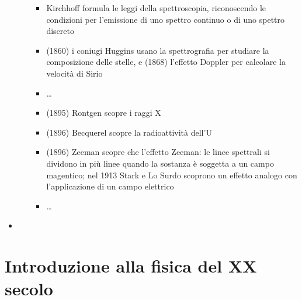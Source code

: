 \documentclass[letterpaper,10pt,italian]{jupyterBook}
\begin{document}
\begin{itemize}
\begin{itemize}
\begin{itemize}
\item {} 
\sphinxAtStartPar
Kirchhoff formula le leggi della spettroscopia, riconoscendo le condizioni per l’emissione di uno spettro continuo o di uno spettro discreto

\item {} 
\sphinxAtStartPar
(1860) i coniugi Huggins usano la spettrografia per studiare la composizione delle stelle, e (1868) l’effetto Doppler per calcolare la velocità di Sirio  

\item {} 
\sphinxAtStartPar
…

\item {} 
\sphinxAtStartPar
(1895) Rontgen scopre i raggi X

\item {} 
\sphinxAtStartPar
(1896) Becquerel scopre la radioattività dell’U

\item {} 
\sphinxAtStartPar
(1896) Zeeman scopre che l’effetto Zeeman: le linee spettrali si dividono in più linee quando la sostanza è soggetta a un campo magentico; nel 1913 Stark e Lo Surdo scoprono un effetto analogo con l’applicazione di un campo elettrico

\item {} 
\sphinxAtStartPar
…

\end{itemize}

\end{itemize}

\item {} 
\sphinxAtStartPar
{}

\end{itemize}

\sphinxstepscope


\chapter{Introduzione alla fisica del XX secolo}
\label{\detokenize{ch/modern/intro:introduzione-alla-fisica-del-xx-secolo}}\label{\detokenize{ch/modern/intro:physics-hs-modern-intro}}\label{\detokenize{ch/modern/intro::doc}}
\sphinxAtStartPar
{}

\sphinxstepscope
\end{document}
